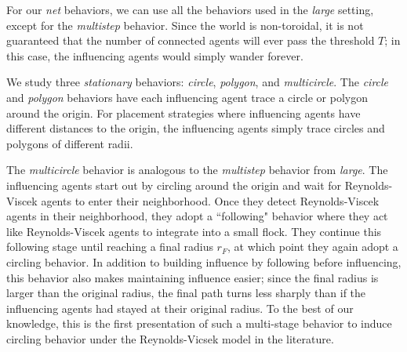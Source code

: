 For our \textit{net} behaviors, we can use all the behaviors used in the
\textit{large} setting, except for the \textit{multistep} behavior.
Since the world is non-toroidal, it is not guaranteed that the number of
connected agents will ever pass the threshold $T$; in this case, the
influencing agents would simply wander forever.

We study three \textit{stationary} behaviors: \textit{circle}, \textit{polygon},
and \textit{multicircle}.
The \textit{circle} and \textit{polygon} behaviors have each influencing agent
trace a circle or polygon around the origin.
For placement strategies where influencing agents have different distances to
the origin, the influencing agents simply trace circles and polygons of
different radii.

The \textit{multicircle} behavior is analogous to the \textit{multistep}
behavior from \textit{large}.
The influencing agents start out by circling around the origin and wait for
Reynolds-Viscek agents to enter their neighborhood.
Once they detect Reynolds-Viscek agents in their neighborhood, they adopt a
``following" behavior where they act like Reynolds-Viscek agents to integrate
into a small flock.
They continue this following stage until reaching a final radius $r_F$, at which
point they again adopt a circling behavior.
In addition to building influence by following before influencing, this behavior
also makes maintaining influence easier; since the final radius is larger than
the original radius, the final path turns less sharply than if the influencing
agents had stayed at their original radius.
To the best of our knowledge, this is the first presentation of such a
multi-stage behavior to induce circling behavior under the Reynolds-Vicsek
model in the literature.

